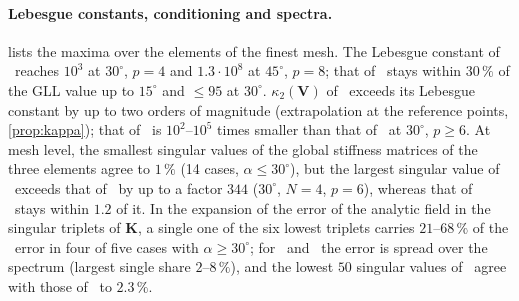 \begin{table}[t]
  \centering\small
  \caption{Thick cylinder, $N=8$: energy error of the discrete solution divided by the energy
    error of the interpolant of the exact field in the same trial space.}
  \label{tab:quasiopt}
  
\end{table}

\paragraph{Lebesgue constants, conditioning and spectra.}  lists the
maxima over the elements of the finest mesh. The Lebesgue constant of \PM\ reaches $10^3$ at
$30^\circ$, $p=4$ and $1.3\cdot10^8$ at $45^\circ$, $p=8$; that of \PH\ stays within $30\,\%$ of the GLL value
up to $15^\circ$ and $\le95$ at $30^\circ$. $\kappa_2(\bm V)$ of \PM\ exceeds its Lebesgue constant by up
to two orders of magnitude (extrapolation at the reference points, \cref{prop:kappa}); that of \PH\
is $10^2$--$10^5$ times smaller than that of \PM\ at $30^\circ$, $p\ge6$. At mesh level, the smallest singular values of the global
stiffness matrices of the three elements agree to $1\,\%$ (14 cases, $\alpha\le30^\circ$), but the
largest singular value of \PM\ exceeds that of \PP\ by up to a factor $344$ ($30^\circ$, $N=4$,
$p=6$), whereas that of \PH\ stays within $1.2$ of it. In the expansion of the error of the analytic
field in the singular triplets of $\bm K$, a single one of the six lowest triplets carries
$21$--$68\,\%$ of the \PM\ error in four of five cases with $\alpha\ge30^\circ$; for \PH\ and \PP\ the error
is spread over the spectrum (largest single share $2$--$8\,\%$), and the lowest $50$ singular values
of \PH\ agree with those of \PP\ to $2.3\,\%$.

\begin{table}[t]
  \centering\small
  \caption{Thick cylinder, $N=8$: Lebesgue constant $\Lambda$ ($16\times16$ sample points per
    element, a lower bound) and condition number $\kappa_2(\bm V)$ of the interpolation matrix,
    maximum over the elements.}
  \label{tab:lebesgue}
  
\end{table}

